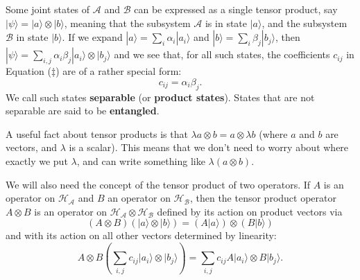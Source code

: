 \documentclass[fleqn]{article}
\begin{document}
Some joint states of \(\mathcal{A}\) and \(\mathcal{B}\) can be expressed as a single tensor product, say \(|\psi\rangle=|a\rangle\otimes|b\rangle\), meaning that the subsystem \(\mathcal{A}\) is in state \(|a\rangle\), and the subsystem \(\mathcal{B}\) in state \(|b\rangle\).
If we expand \(|a\rangle=\sum_i\alpha_i|a_i\rangle\) and \(|b\rangle=\sum_i\beta_j|b_j\rangle\), then \(|\psi\rangle=\sum_{i,j}\alpha_i\beta_j|a_i\rangle\otimes|b_j\rangle\) and we see that, for all such states, the coefficients \(c_{ij}\) in Equation (\(\ddagger\)) are of a rather special form:
\[
  c_{ij} = \alpha_i\beta_j.
\]
We call such states \textbf{separable} (or \textbf{product states}).
States that are not separable are said to be \textbf{entangled}.

A useful fact about tensor products is that \(\lambda a\otimes b = a\otimes\lambda b\) (where \(a\) and \(b\) are vectors, and \(\lambda\) is a scalar).
This means that we don't need to worry about where exactly we put \(\lambda\), and can write something like \(\lambda(a\otimes b)\).

We will also need the concept of the tensor product of two operators.
If \(A\) is an operator on \(\mathcal{H}_{\mathcal{A}}\) and \(B\) an operator on \(\mathcal{H}_{\mathcal{B}}\), then the tensor product operator \(A\otimes B\) is an operator on \(\mathcal{H}_{\mathcal{A}}\otimes\mathcal{H}_{\mathcal{B}}\) defined by its action on product vectors via
\[
  (A\otimes B)(|a\rangle\otimes|b\rangle) = (A|a\rangle)\otimes (B|b\rangle)
\]
and with its action on all other vectors determined by linearity:
\[
  A\otimes B \left( \sum_{i,j} c_{ij}|a_i\rangle\otimes|b_j\rangle \right)
  = \sum_{i,j}c_{ij} A|a_i\rangle\otimes B|b_j\rangle.
\]
\end{document}

